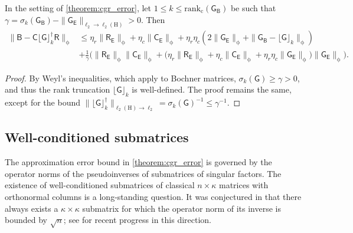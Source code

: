 \documentclass[onefignum,onetabnum]{siamart250211}
\newcommand{\Hilb}{\mathrm{H}}
\newcommand{\Batrix}[1]{\bm{\Matrix{#1}}}
\newcommand{\Matrix}[1]{\mathsf{#1}}
\newcommand{\pinv}{\dagger}
\newcommand{\Rank}[3][]{\mathrm{rank_{#2}} #1( #3 #1)}
\newcommand{\truncate}[3][]{#1\lfloor #2 #1\rfloor_{#3}}
\newcommand{\Norm}[3][]{#1\| #2 #1\|_{\mathrm{#3}}}
\begin{document}
\begin{corollary}
\label{corollary:cgr_error_k}
In the setting of \cref{theorem:cgr_error}, let $1 \leq k \leq \Rank{c}{\Batrix{G}_{\Batrix{B}}}$ be such that $\gamma = \sigma_{k}(\Batrix{G}_{\Batrix{B}}) - \Norm{\Batrix{G}_{\Batrix{E}}}{\ell_2 \to \ell_2(\Hilb)} > 0$.
Then
\begin{align*}
    \Norm{\Batrix{B} - \Batrix{C} \truncate{\Batrix{G}}{k}^\pinv \Batrix{R}}{\phi} &\leq \eta_r \Norm{\Batrix{R}_{\Batrix{E}}}{\phi} + \eta_c \Norm{\Batrix{C}_{\Batrix{E}}}{\phi} + \eta_r \eta_c (2 \Norm{\Batrix{G}_{\Batrix{E}}}{\phi} + \Norm{\Batrix{G}_{\Batrix{B}} - \truncate{\Batrix{G}}{k}}{\phi}) \\
    &+ \frac{1}{\gamma} \Big( \Norm{\Batrix{R}_{\Batrix{E}}}{\phi} \Norm{\Batrix{C}_{\Batrix{E}}}{\phi} + \big(\eta_r \Norm{\Batrix{R}_{\Batrix{E}}}{\phi} + \eta_c \Norm{\Batrix{C}_{\Batrix{E}}}{\phi} + \eta_r \eta_c \Norm{\Batrix{G}_{\Batrix{E}}}{\phi}\big) \Norm{\Batrix{G}_{\Batrix{E}}}{\phi} \Big).
\end{align*}
\end{corollary}
\begin{proof}
By Weyl's inequalities, which apply to Bochner matrices, $\sigma_k(\Batrix{G}) \geq \gamma > 0$, and thus the rank truncation $\truncate{\Batrix{G}}{k}$ is well-defined.
The proof remains the same, except for the bound $\Norm{\truncate{\Batrix{G}}{k}^\pinv}{\ell_2(\Hilb) \to \ell_2} = \sigma_k(\Batrix{G})^{-1} \leq \gamma^{-1}$.
\end{proof}

\subsection{Well-conditioned submatrices}
\label{subsec:rank_excess}
The approximation error bound in \cref{theorem:cgr_error} is governed by the operator norms of the pseudoinverses of submatrices of singular factors.
The existence of well-conditioned submatrices of classical $n \times \kappa$ matrices with orthonormal columns is a long-standing question.
It was conjectured in \cite{goreinov1997theory} that there always exists a $\kappa \times \kappa$ submatrix for which the operator norm of its inverse is bounded by $\sqrt{n}$; see \cite{nesterenko2025subspaces, sengupta2026submatrices} for recent progress in this direction.
\end{document}
